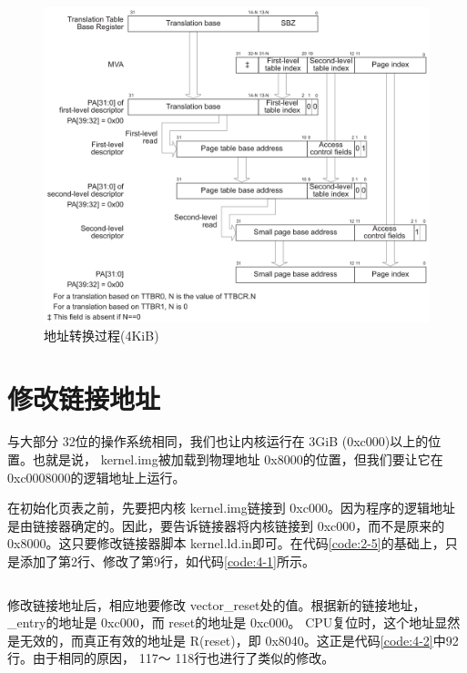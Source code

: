\documentclass[main.tex]{subfiles}
\begin{document}
\begin{CJK*}{UTF8}{song}
\begin{figure}[htp]
\centering
\includegraphics[scale=0.3]{figures/4-4}
\caption{地址转换过程(4KiB)}
\label{figure:4-4}
\end{figure}

\section{修改链接地址}
与大部分 32位的操作系统相同，我们也让内核运行在 3\-GiB (0xc000)以上的位置。也就是说， kernel.img被加载到物理地址 0x8000的位置，但我们要让它在 0xc000\-8000的逻辑地址上运行。

\par
在初始化页表之前，先要把内核 kernel.img链接到 0xc000。因为程序的逻辑地址是由链接器确定的。因此，要告诉链接器将内核链接到 0xc000，而不是原来的 0x8000。这只要修改链接器脚本 kernel.ld.in即可。在代码\ref{code:2-5}的基础上，只是添加了第2行、修改了第9行，如代码\ref{code:4-1}所示。

\begin{code}
\label{code:4-1}
\inputminted[firstline=1,lastline=12,linenos,numbersep=5pt,frame=lines,framesep=2mm]{c}{src/chapter04/kernel/kernel.ld.in}
\end{code}

修改链接地址后，相应地要修改 vector\_\-reset处的值。根据新的链接地址， \_entry的地址是 0xc000，而 reset的地址是 0xc000。 CPU复位时，这个地址显然是无效的，而真正有效的地址是 R(reset)，即 0x8040。这正是代码\ref{code:4-2}中92行。由于相同的原因， 117～ 118行也进行了类似的修改。


\end{CJK*}
\end{document}
